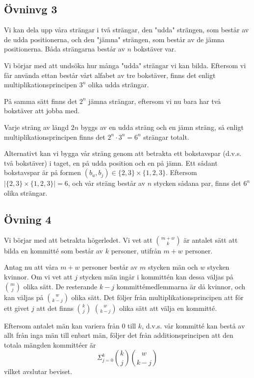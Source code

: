 \documentclass{article}
\begin{document}
\subsection*{Övninvg 3}
Vi kan dela upp våra strängar i två strängar, den "udda" strängen, som består av de udda positionerna, och den "jämna" strängen, som består av de jämna positionerna. Båda strängarna består av $n$ bokstäver var. 

Vi börjar med att undsöka hur många "udda" strängar vi kan bilda. Eftersom vi får använda ettan består vårt alfabet av tre bokstäver,  finns det enligt multiplikationsprincipen $3^n$ olika udda strängar. 

På samma sätt finns det $2^n$ jämna strängar, eftersom vi nu bara har två bokstäver att jobba med. 

Varje sträng av längd $2n$ byggs av en udda sträng och en jämn sträng, så enligt multiplikationsprincipen finns det $2^n\cdot 3^n=6^n$ strängar totalt. 


Alternativt kan vi bygga vår sträng genom att betrakta ett bokstavspar (d.v.s. två bokstäver) i taget, en på udda position och en på jämn. Ett sådant bokstavspar är på formen $(b_u, b_j)\in \{2, 3\}\times \{1, 2, 3\}$. Eftersom $|\{2, 3\}\times \{1, 2, 3\}|=6$, och vår sträng består av $n$ stycken sådana par, finns det $6^n$ olika strängar. 

\subsection*{Övning 4}
Vi börjar med att betrakta högerledet. Vi vet att $m + w \choose k$ är antalet sätt att bilda en kommitté som består av $k$ personer, utifrån $m + w$ personer. 


Antag nu att våra $m + w$ personer består av $m$ stycken män och $w$ stycken kvinnor. Om vi vet att $j$ stycken män ingår i kommittén kan dessa väljas på $m \choose j$ olika sätt. De resterande $k - j$ kommittémedlemmarna är då kvinnor, och kan väljas på $w \choose k - j$ olika sätt. Det följer från multiplikationsprincipen att för ett givet $j$ att det finns $k \choose j$ $w \choose k - j$ olika sätt att välja en kommitté. 

Eftersom antalet män kan variera från $0$ till $k$, d.v.s. vår kommitté kan bestå av allt från inga män till enbart män, följer det från additionsprincipen att den totala mängden kommittéer är $$
\Sigma _{j=0} ^{k} {k \choose j} {w \choose k - j}
$$
vilket avslutar beviset. 
\end{document}
